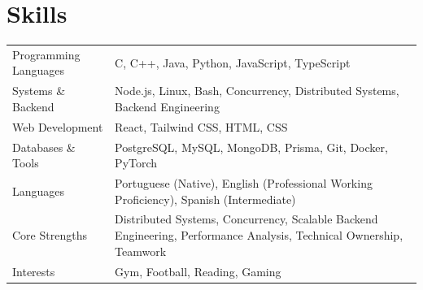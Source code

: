 \documentclass[a4paper,12pt]{article}
\begin{document}
\section{Skills}
\begin{tabularx}{\linewidth}{@{}l X@{}}
Programming Languages & \normalsize{C, C++, Java, Python, JavaScript, TypeScript} \\

Systems \& Backend & \normalsize{Node.js, Linux, Bash, Concurrency, Distributed Systems, Backend Engineering} \\

Web Development & \normalsize{React, Tailwind CSS, HTML, CSS} \\

Databases \& Tools & \normalsize{PostgreSQL, MySQL, MongoDB, Prisma, Git, Docker, PyTorch} \\

Languages & \normalsize{Portuguese (Native), English (Professional Working Proficiency), Spanish (Intermediate)} \\

Core Strengths & \normalsize{Distributed Systems, Concurrency, Scalable Backend Engineering, Performance Analysis, Technical Ownership, Teamwork} \\

Interests & \normalsize{Gym, Football, Reading, Gaming} \\
\end{tabularx}

\vfill
{}
\end{document}
